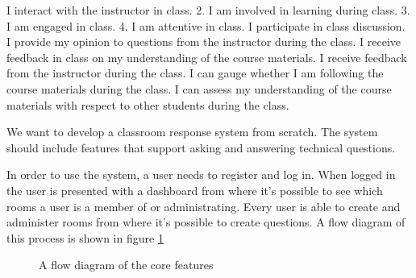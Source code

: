 \documentclass{article}
\begin{document}
    I interact with the instructor in class. 2. I am involved in learning during class. 3. I am engaged in class.
    4. I am attentive in class.
    I participate in class discussion.
    I provide my opinion to questions from the instructor during the class.
    I receive feedback in class on my understanding of the course materials.
    I receive feedback from the instructor during the class.
    I can gauge whether I am following the course materials during the class.
    I can assess my understanding of the course materials with respect to other students during the class.
    
    
    


We want to develop a classroom response system from scratch. The system should include features that support asking and answering technical questions. 

In order to use the system, a user needs to register and log in. When logged in the user is presented with a dashboard from where it's possible to see which rooms a user is a member of or administrating. Every user is able to create and administer rooms from where it's possible to create questions. A flow diagram of this process is shown in figure \ref{fig:flow-diagram} 

\begin{figure}[H]
    \capstart
	\centering
    
    
	\caption[Flow Diagram]{A flow diagram of the core features \label{fig:flow-diagram}}
\end{figure}
\end{document}
